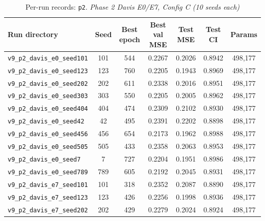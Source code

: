 \begin{table}[!h]
\centering\scriptsize
\caption{Per-run records: \texttt{p2}. \textit{Phase 2 Davis E0/E7, Config C (10 seeds each)}}
\label{tab:v9_runs_p2}
\begin{tabular}{p{4.8cm}cccccc}
\toprule
Run directory & Seed & Best epoch & Best val MSE & Test MSE & Test CI & Params \\
\midrule
\texttt{v9\_\allowbreak{}p2\_\allowbreak{}davis\_\allowbreak{}e0\_\allowbreak{}seed101} & 101 & 544 & 0.2267 & 0.2026 & 0.8942 & 498,177 \\
\texttt{v9\_\allowbreak{}p2\_\allowbreak{}davis\_\allowbreak{}e0\_\allowbreak{}seed123} & 123 & 760 & 0.2205 & 0.1943 & 0.8969 & 498,177 \\
\texttt{v9\_\allowbreak{}p2\_\allowbreak{}davis\_\allowbreak{}e0\_\allowbreak{}seed202} & 202 & 611 & 0.2338 & 0.2016 & 0.8951 & 498,177 \\
\texttt{v9\_\allowbreak{}p2\_\allowbreak{}davis\_\allowbreak{}e0\_\allowbreak{}seed303} & 303 & 550 & 0.2205 & 0.2005 & 0.8962 & 498,177 \\
\texttt{v9\_\allowbreak{}p2\_\allowbreak{}davis\_\allowbreak{}e0\_\allowbreak{}seed404} & 404 & 474 & 0.2309 & 0.2102 & 0.8930 & 498,177 \\
\texttt{v9\_\allowbreak{}p2\_\allowbreak{}davis\_\allowbreak{}e0\_\allowbreak{}seed42} & 42 & 495 & 0.2391 & 0.2202 & 0.8898 & 498,177 \\
\texttt{v9\_\allowbreak{}p2\_\allowbreak{}davis\_\allowbreak{}e0\_\allowbreak{}seed456} & 456 & 654 & 0.2173 & 0.1962 & 0.8988 & 498,177 \\
\texttt{v9\_\allowbreak{}p2\_\allowbreak{}davis\_\allowbreak{}e0\_\allowbreak{}seed505} & 505 & 433 & 0.2358 & 0.2063 & 0.8953 & 498,177 \\
\texttt{v9\_\allowbreak{}p2\_\allowbreak{}davis\_\allowbreak{}e0\_\allowbreak{}seed7} & 7 & 727 & 0.2204 & 0.1951 & 0.8986 & 498,177 \\
\texttt{v9\_\allowbreak{}p2\_\allowbreak{}davis\_\allowbreak{}e0\_\allowbreak{}seed789} & 789 & 605 & 0.2192 & 0.2045 & 0.8931 & 498,177 \\
\texttt{v9\_\allowbreak{}p2\_\allowbreak{}davis\_\allowbreak{}e7\_\allowbreak{}seed101} & 101 & 318 & 0.2352 & 0.2087 & 0.8890 & 498,177 \\
\texttt{v9\_\allowbreak{}p2\_\allowbreak{}davis\_\allowbreak{}e7\_\allowbreak{}seed123} & 123 & 426 & 0.2256 & 0.1998 & 0.8936 & 498,177 \\
\texttt{v9\_\allowbreak{}p2\_\allowbreak{}davis\_\allowbreak{}e7\_\allowbreak{}seed202} & 202 & 429 & 0.2279 & 0.2024 & 0.8924 & 498,177 \\

\end{tabular}
\end{table}
